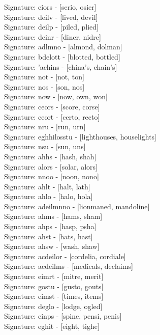 Signature: {eiors} - [serio, osier] \\
Signature: {deilv} - [lived, devil] \\
Signature: {deilp} - [piled, plied] \\
Signature: {deinr} - [diner, nidre] \\
Signature: {adlmno} - [almond, dolman] \\
Signature: {bdelott} - [blotted, bottled] \\
Signature: {'achins} - [china's, chain's] \\
Signature: {not} - [not, ton] \\
Signature: {nos} - [son, nos] \\
Signature: {now} - [now, own, won] \\
Signature: {ceors} - [score, corse] \\
Signature: {ceort} - [certo, recto] \\
Signature: {nru} - [run, urn] \\
Signature: {eghhilosstu} - [lighthouses, houselights] \\
Signature: {nsu} - [sun, uns] \\
Signature: {ahhs} - [hash, shah] \\
Signature: {alors} - [solar, alors] \\
Signature: {nnoo} - [noon, nono] \\
Signature: {ahlt} - [halt, lath] \\
Signature: {ahlo} - [halo, hola] \\
Signature: {adeilmnno} - [lionmaned, mandoline] \\
Signature: {ahms} - [hams, sham] \\
Signature: {ahps} - [hasp, psha] \\
Signature: {ahst} - [hats, hast] \\
Signature: {ahsw} - [wash, shaw] \\
Signature: {acdeilor} - [cordelia, cordiale] \\
Signature: {acdeilms} - [medicals, declaims] \\
Signature: {eimrt} - [mitre, merit] \\
Signature: {gostu} - [gusto, gouts] \\
Signature: {eimst} - [times, items] \\
Signature: {deglo} - [lodge, ogled] \\
Signature: {einps} - [spine, pensi, penis] \\
Signature: {eghit} - [eight, tighe] \\
